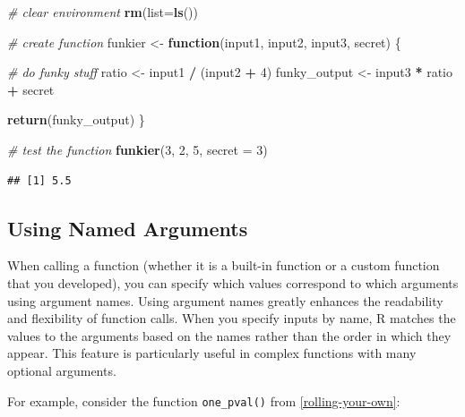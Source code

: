\documentclass[
]{book}
\newenvironment{Shaded}{\begin{snugshade}}{\end{snugshade}}
\newcommand{\AttributeTok}[1]{\textcolor[rgb]{0.13,0.29,0.53}{#1}}
\newcommand{\CommentTok}[1]{\textcolor[rgb]{0.56,0.35,0.01}{\textit{#1}}}
\newcommand{\ControlFlowTok}[1]{\textcolor[rgb]{0.13,0.29,0.53}{\textbf{#1}}}
\newcommand{\DecValTok}[1]{\textcolor[rgb]{0.00,0.00,0.81}{#1}}
\newcommand{\FunctionTok}[1]{\textcolor[rgb]{0.13,0.29,0.53}{\textbf{#1}}}
\newcommand{\NormalTok}[1]{#1}
\newcommand{\OtherTok}[1]{\textcolor[rgb]{0.56,0.35,0.01}{#1}}
\newcommand{\SpecialCharTok}[1]{\textcolor[rgb]{0.81,0.36,0.00}{\textbf{#1}}}
\begin{document}
\begin{Shaded}
\begin{Highlighting}[]
\CommentTok{\# clear environment}
\FunctionTok{rm}\NormalTok{(}\AttributeTok{list=}\FunctionTok{ls}\NormalTok{()) }

\CommentTok{\# create function}
\NormalTok{funkier }\OtherTok{\textless{}{-}} \ControlFlowTok{function}\NormalTok{(input1, input2, input3, secret) \{}
  
  \CommentTok{\# do funky stuff}
\NormalTok{  ratio }\OtherTok{\textless{}{-}}\NormalTok{ input1 }\SpecialCharTok{/}\NormalTok{ (input2 }\SpecialCharTok{+} \DecValTok{4}\NormalTok{)}
\NormalTok{  funky\_output }\OtherTok{\textless{}{-}}\NormalTok{ input3 }\SpecialCharTok{*}\NormalTok{ ratio }\SpecialCharTok{+}\NormalTok{ secret}
  
  \FunctionTok{return}\NormalTok{(funky\_output)  }
\NormalTok{\}}


\CommentTok{\# test the function}
\FunctionTok{funkier}\NormalTok{(}\DecValTok{3}\NormalTok{, }\DecValTok{2}\NormalTok{, }\DecValTok{5}\NormalTok{, }\AttributeTok{secret =} \DecValTok{3}\NormalTok{)}
\end{Highlighting}
\end{Shaded}

\begin{verbatim}
## [1] 5.5
\end{verbatim}

\subsection{Using Named Arguments}\label{using-named-arguments}

When calling a function (whether it is a built-in function or a custom function that you developed), you can specify which values correspond to which arguments using argument names.
Using argument names greatly enhances the readability and flexibility of function calls.
When you specify inputs by name, R matches the values to the arguments based on the names rather than the order in which they appear.
This feature is particularly useful in complex functions with many optional arguments.

For example, consider the function \texttt{one\_pval()} from \ref{rolling-your-own}:

\begin{Shaded}
\end{Shaded}
\end{document}
